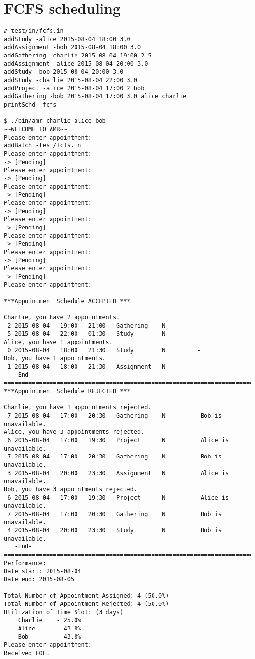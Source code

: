 \documentclass[12pt,a4paper]{report}
\begin{document}
\section{FCFS scheduling}
\begin{lstlisting}
# test/in/fcfs.in
addStudy -alice 2015-08-04 18:00 3.0
addAssignment -bob 2015-08-04 18:00 3.0
addGathering -charlie 2015-08-04 19:00 2.5
addAssignment -alice 2015-08-04 20:00 3.0
addStudy -bob 2015-08-04 20:00 3.0
addStudy -charlie 2015-08-04 22:00 3.0
addProject -alice 2015-08-04 17:00 2 bob
addGathering -bob 2015-08-04 17:00 3.0 alice charlie
printSchd -fcfs

$ ./bin/amr charlie alice bob
~~WELCOME TO AMR~~
Please enter appointment:
addBatch -test/fcfs.in
Please enter appointment:
-> [Pending]
Please enter appointment:
-> [Pending]
Please enter appointment:
-> [Pending]
Please enter appointment:
-> [Pending]
Please enter appointment:
-> [Pending]
Please enter appointment:
-> [Pending]
Please enter appointment:
-> [Pending]
Please enter appointment:
-> [Pending]
Please enter appointment:

***Appointment Schedule ACCEPTED ***

Charlie, you have 2 appointments.
 2 2015-08-04   19:00   21:00   Gathering    N         -
 5 2015-08-04   22:00   01:30   Study        N         -
Alice, you have 1 appointments.
 0 2015-08-04   18:00   21:30   Study        N         -
Bob, you have 1 appointments.
 1 2015-08-04   18:00   21:30   Assignment   N         -
   -End-
===========================================================================
***Appointment Schedule REJECTED ***

Charlie, you have 1 appointments rejected.
 7 2015-08-04   17:00   20:30   Gathering    N          Bob is unavailable.
Alice, you have 3 appointments rejected.
 6 2015-08-04   17:00   19:30   Project      N          Alice is unavailable.
 7 2015-08-04   17:00   20:30   Gathering    N          Bob is unavailable.
 3 2015-08-04   20:00   23:30   Assignment   N          Alice is unavailable.
Bob, you have 3 appointments rejected.
 6 2015-08-04   17:00   19:30   Project      N          Alice is unavailable.
 7 2015-08-04   17:00   20:30   Gathering    N          Bob is unavailable.
 4 2015-08-04   20:00   23:30   Study        N          Bob is unavailable.
   -End-
===========================================================================
Performance:
Date start: 2015-08-04
Date end: 2015-08-05

Total Number of Appointment Assigned: 4 (50.0%)
Total Number of Appointment Rejected: 4 (50.0%)
Utilization of Time Slot: (3 days)
    Charlie    - 25.0%
    Alice      - 43.8%
    Bob        - 43.8%
Please enter appointment:
Received EOF.
\end{lstlisting}
\end{document}
